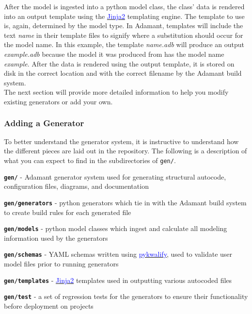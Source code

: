 After the model is ingested into a python model class, the class' data is rendered into an output template using the \href{http://jinja.pocoo.org}{\textcolor{blue}{Jinja2}} templating engine. The template to use is, again, determined by the model type. In Adamant, templates will include the text \textit{name} in their template files to signify where a substitution should occur for the model name. In this example, the template \textit{name.adb} will produce an output \textit{example.adb} because the model it was produced from has the model name \textit{example}. After the data is rendered using the output template, it is stored on disk in the correct location and with the correct filename by the Adamant build system. \\

The next section will provide more detailed information to help you modify existing generators or add your own.

\subsubsection{Adding a Generator} \label{Adding Generators}

To better understand the generator system, it is instructive to understand how the different pieces are laid out in the repository. The following is a description of what you can expect to find in the subdirectories of \texttt{gen/}.

\vspace{5mm} %
\begin{spaceditemize}
  \item \textbf{\texttt{gen/}} - Adamant generator system used for generating structural autocode, configuration files, diagrams, and documentation 
  \item \textbf{\texttt{gen/generators}} - python generators which tie in with the Adamant build system to create build rules for each generated file
  \item \textbf{\texttt{gen/models}} - python model classes which ingest and calculate all modeling information used by the generators
  \item \textbf{\texttt{gen/schemas}} - YAML schemas written using \href{https://pykwalify.readthedocs.io/en/unstable/}{\textcolor{blue}{pykwalify}}, used to validate user model files prior to running generators
  \item \textbf{\texttt{gen/templates}} - \href{http://jinja.pocoo.org}{\textcolor{blue}{Jinja2}} templates used in outputting various autocoded files
  \item \textbf{\texttt{gen/test}} - a set of regression tests for the generators to ensure their functionality before deployment on projects
\end{spaceditemize}
\vspace{5mm} %

